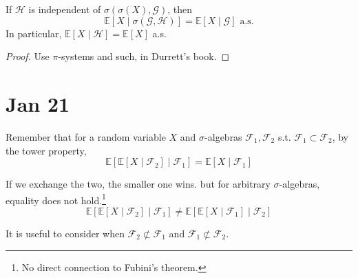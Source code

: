 	\begin{theorem}
	  If $\mathscr{H}$ is independent of $\sigma(\sigma(X), \mathscr{G})$, then 
		\begin{equation}
			\mathbb{E}[X \mid \sigma(\mathscr{G}, \mathscr{H})] = \mathbb{E}[X \mid \mathscr{G}] \text{ a.s.}
		\end{equation}
		In particular, $\mathbb{E}[X \mid \mathscr{H}] = \mathbb{E}[X]$ a.s. 
	\end{theorem}
	\begin{proof}
	  Use $\pi$-systems and such, in Durrett's book. 
	\end{proof}

\section{Jan 21} 

	Remember that for a random variable $X$ and $\sigma$-algebras $\mathscr{F}_1, \mathscr{F}_2$ s.t. $\mathscr{F}_1 \subset \mathscr{F}_2$, by the tower property, 
	\begin{equation}
		\mathbb{E}[ \mathbb{E}[X \mid \mathscr{F}_2] \mid \mathscr{F}_1] = \mathbb{E}[X \mid \mathscr{F}_1] 
	\end{equation}

	If we exchange the two, the smaller one wins. but for arbitrary $\sigma$-algebras, equality does not hold.\footnote{No direct connection to Fubini's theorem.}
	\begin{equation}
		\mathbb{E}[ \mathbb{E}[X \mid \mathscr{F}_2] \mid \mathscr{F}_1] \neq \mathbb{E}[ \mathbb{E}[X \mid \mathscr{F}_1] \mid \mathscr{F}_2]
	\end{equation}

	It is useful to consider when $\mathscr{F}_2 \not\subset \mathscr{F}_1$ and $\mathscr{F}_1 \not\subset \mathscr{F}_2$. 

